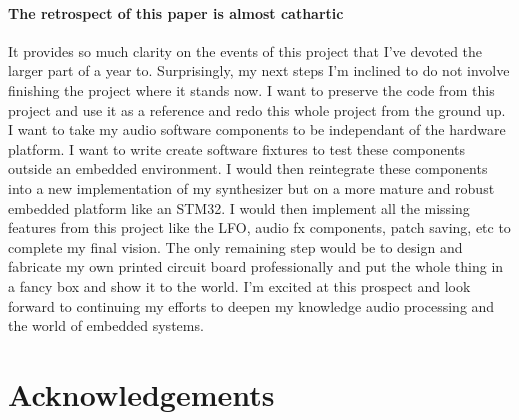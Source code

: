 \documentclass[acmlarge,screen]{acmart}
\begin{document}
	\paragraph{The retrospect of this paper is almost cathartic} It provides so much clarity on the events of this project that I've devoted the larger part of a year to. Surprisingly, my next steps I'm inclined to do not involve finishing the project where it stands now. I want to preserve the code from this project and use it as a reference and redo this whole project from the ground up. I want to take my audio software components to be independant of the hardware platform. I want to write create software fixtures to test these components outside an embedded environment. I would then reintegrate these components into a new implementation of my synthesizer but on a more mature and robust embedded platform like an STM32. I would then implement all the missing features from this project like the LFO, audio fx components, patch saving, etc to complete my final vision. The only remaining step would be to design and fabricate my own printed circuit board professionally and put the whole thing in a fancy box and show it to the world. I'm excited at this prospect and look forward to continuing my efforts to deepen my knowledge audio processing and the world of embedded systems.

\section{Acknowledgements}
\end{document}
